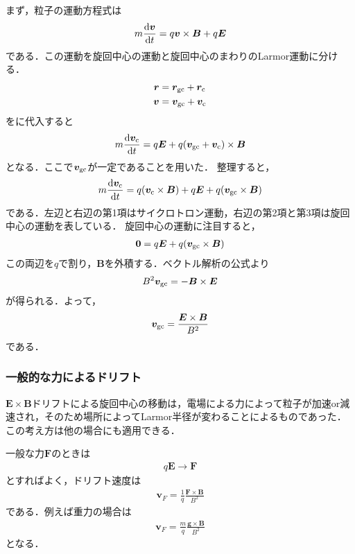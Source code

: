 \documentclass{report}
\begin{document}
        まず，粒子の運動方程式は
        \begin{align}
          m\dv{\bm{v}}{t} = q\bm{v}\times\bm{B} + q\bm{E} \label{eom-cyclotron}
        \end{align}
        である．この運動を旋回中心の運動と旋回中心のまわりのLarmor運動に分ける．
        \begin{align}
          \bm{r} &= \bm{r}_{\mathrm{gc}} + \bm{r}_{\mathrm{c}}\\
          \bm{v} &= \bm{v}_{\mathrm{gc}} + \bm{v}_{\mathrm{c}} \label{drift-velocity}
        \end{align}
        をに代入すると
        \begin{align}
          m \dv{\bm{v}_{\mathrm{c}}}{t} = q\bm{E} + q(\bm{v}_{\mathrm{gc}} + \bm{v}_{\mathrm{c}})\times\bm{B}
        \end{align}
        となる．ここで$\bm{v}_{\mathrm{gc}}$が一定であることを用いた．
        整理すると，
        \begin{align}
          m \dv{\bm{v}_{\mathrm{c}}}{t} = q(\bm{v}_{\mathrm{c}} \times \bm{B}) + q\bm{E} + q(\bm{v}_{\mathrm{gc}}\times\bm{B})
        \end{align}
        である．左辺と右辺の第1項はサイクロトロン運動，右辺の第2項と第3項は旋回中心の運動を表している．
        旋回中心の運動に注目すると，
        \begin{align}
          \bm{0} = q\bm{E} + q(\bm{v}_{\mathrm{gc}}\times\bm{B})
        \end{align}
        この両辺を$q$で割り，$\bm{B}$を外積する．ベクトル解析の公式より
        \begin{align}
          B^2 \bm{v}_{\mathrm{gc}} = -\bm{B} \times \bm{E}
        \end{align}
        が得られる．よって，
        \begin{align}
          \bm{v}_{\mathrm{gc}} = \frac{\bm{E}\times\bm{B}}{B^2}
        \end{align}
        である．

      \subsubsection{一般的な力によるドリフト}
        $\bm{E}\times\bm{B}$ドリフトによる旋回中心の移動は，電場による力によって粒子が加速or減速され，そのため場所によってLarmor半径が変わることによるものであった．
        この考え方は他の場合にも適用できる．

        一般な力$\bm{F}$のときは
        \begin{align}
          q\bm{E} \to \bm{F}
        \end{align}
        とすればよく，ドリフト速度は
        \begin{align}
          \bm{v}_{F} = \frac{1}{q}\frac{\bm{F}\times\bm{B}}{B^2}
        \end{align}
        である．例えば重力の場合は
        \begin{align}
          \bm{v}_{F} = \frac{m}{q}\frac{\bm{g}\times\bm{B}}{B^2}
        \end{align}
        となる．
      
\end{document}

